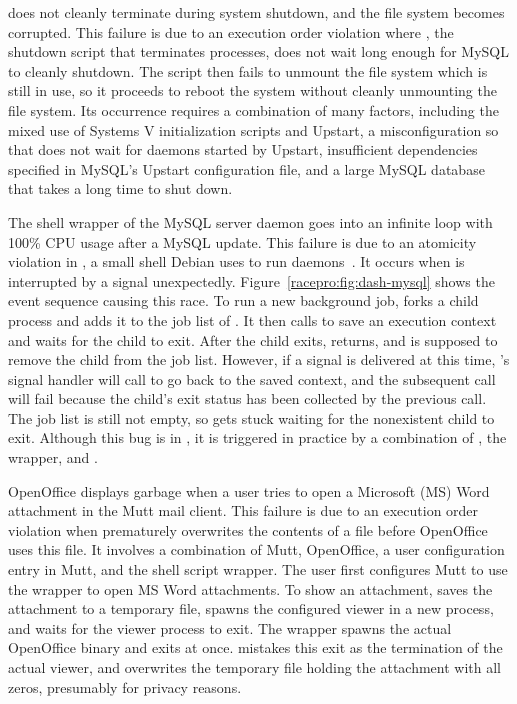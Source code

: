    does not cleanly terminate
during system shutdown, and the file system becomes corrupted.  This
failure is due to an execution order violation where ,
the shutdown script that terminates processes, does not wait long
enough for MySQL to cleanly shutdown. The script then fails to unmount
the file system which is still in use, so it proceeds to reboot the
system without cleanly unmounting the file system.  Its occurrence
requires a combination of many factors, including the mixed use of
Systems V initialization scripts and Upstart, a misconfiguration so
that  does not wait for daemons started by Upstart,
insufficient dependencies specified in MySQL's Upstart configuration
file, and a large MySQL database that takes a long time to shut down.

 The shell wrapper
 of the MySQL server daemon  goes into an
infinite loop with 100\% CPU usage after a MySQL update.
This failure is due to an atomicity violation in ,
a small shell Debian uses to run daemons~\cite{dash}.  It occurs
when  is interrupted by a signal unexpectedly.
Figure~\ref{racepro:fig:dash-mysql} shows the event sequence causing this race.
To run a new background job,  forks a child process and
adds it to the job list of .  It then calls  to save an execution
context and waits for the child to exit.  After the child exits,
 returns, and  is supposed to remove the child from
the job list.  However, if a signal is delivered at this time, 's
signal handler will call  to go back to the saved 
context, and the subsequent  call will fail because the child's
exit status has been collected by the previous  call.  
The job list is still not empty, so  gets stuck waiting for the
nonexistent child to exit.  Although this bug is in , it is
triggered in practice by a combination of , the 
wrapper, and .

  OpenOffice displays
garbage when a user tries to open a Microsoft (MS) Word attachment in the
Mutt mail client.
This failure is due to an execution order violation
when  prematurely overwrites the contents of a file
before OpenOffice uses this file.  It involves a
combination of Mutt, OpenOffice, a user configuration entry
in Mutt, and the  shell script wrapper.  The user
first configures Mutt to use the  wrapper to open
MS Word attachments.  To show an attachment,  saves the
attachment to a temporary file, spawns the configured viewer in a new
process, and waits for the viewer process to exit.  The 
wrapper spawns the actual OpenOffice binary and exits at once.
 mistakes this exit as the termination of the actual viewer, and
overwrites the temporary file holding the attachment with all zeros,
presumably for privacy reasons.


